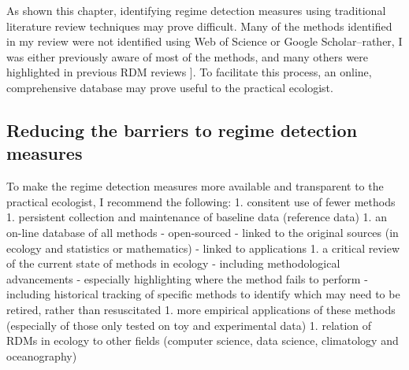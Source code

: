 \documentclass[12pt,twoside,openany]{reedthesis}
\begin{document}
As shown this chapter, identifying regime detection measures using
traditional literature review techniques may prove difficult. Many of
the methods identified in my review were not identified using Web of
Science or Google Scholar--rather, I was either previously aware of most
of the methods, and many others were highlighted in previous RDM reviews
{]}. To facilitate this process, an online, comprehensive database may
prove useful to the practical ecologist.

\subsection{Reducing the barriers to regime detection
measures}\label{reducing-the-barriers-to-regime-detection-measures}

To make the regime detection measures more available and transparent to
the practical ecologist, I recommend the following: 1. consitent use of
fewer methods 1. persistent collection and maintenance of baseline data
(reference data) 1. an on-line database of all methods - open-sourced -
linked to the original sources (in ecology and statistics or
mathematics) - linked to applications 1. a critical review of the
current state of methods in ecology - including methodological
advancements - especially highlighting where the method fails to perform
- including historical tracking of specific methods to identify which
may need to be retired, rather than resuscitated 1. more empirical
applications of these methods (especially of those only tested on toy
and experimental data) 1. relation of RDMs in ecology to other fields
(computer science, data science, climatology and oceanography)
\end{document}
